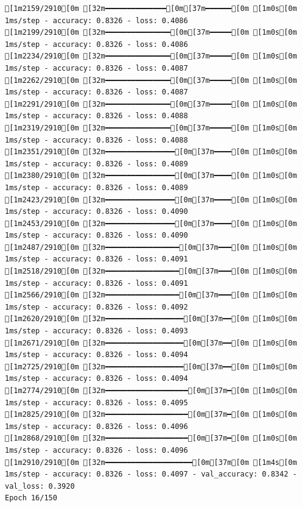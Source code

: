 \documentclass[
  letterpaper,
  DIV=11,
  numbers=noendperiod]{scrartcl}
\begin{document}
\begin{verbatim}
[1m2159/2910[0m [32m━━━━━━━━━━━━━━[0m[37m━━━━━━[0m [1m0s[0m 1ms/step - accuracy: 0.8326 - loss: 0.4086
[1m2199/2910[0m [32m━━━━━━━━━━━━━━━[0m[37m━━━━━[0m [1m0s[0m 1ms/step - accuracy: 0.8326 - loss: 0.4086
[1m2234/2910[0m [32m━━━━━━━━━━━━━━━[0m[37m━━━━━[0m [1m0s[0m 1ms/step - accuracy: 0.8326 - loss: 0.4087
[1m2262/2910[0m [32m━━━━━━━━━━━━━━━[0m[37m━━━━━[0m [1m0s[0m 1ms/step - accuracy: 0.8326 - loss: 0.4087
[1m2291/2910[0m [32m━━━━━━━━━━━━━━━[0m[37m━━━━━[0m [1m0s[0m 1ms/step - accuracy: 0.8326 - loss: 0.4088
[1m2319/2910[0m [32m━━━━━━━━━━━━━━━[0m[37m━━━━━[0m [1m0s[0m 1ms/step - accuracy: 0.8326 - loss: 0.4088
[1m2351/2910[0m [32m━━━━━━━━━━━━━━━━[0m[37m━━━━[0m [1m0s[0m 1ms/step - accuracy: 0.8326 - loss: 0.4089
[1m2380/2910[0m [32m━━━━━━━━━━━━━━━━[0m[37m━━━━[0m [1m0s[0m 1ms/step - accuracy: 0.8326 - loss: 0.4089
[1m2423/2910[0m [32m━━━━━━━━━━━━━━━━[0m[37m━━━━[0m [1m0s[0m 1ms/step - accuracy: 0.8326 - loss: 0.4090
[1m2453/2910[0m [32m━━━━━━━━━━━━━━━━[0m[37m━━━━[0m [1m0s[0m 1ms/step - accuracy: 0.8326 - loss: 0.4090
[1m2487/2910[0m [32m━━━━━━━━━━━━━━━━━[0m[37m━━━[0m [1m0s[0m 1ms/step - accuracy: 0.8326 - loss: 0.4091
[1m2518/2910[0m [32m━━━━━━━━━━━━━━━━━[0m[37m━━━[0m [1m0s[0m 1ms/step - accuracy: 0.8326 - loss: 0.4091
[1m2566/2910[0m [32m━━━━━━━━━━━━━━━━━[0m[37m━━━[0m [1m0s[0m 1ms/step - accuracy: 0.8326 - loss: 0.4092
[1m2620/2910[0m [32m━━━━━━━━━━━━━━━━━━[0m[37m━━[0m [1m0s[0m 1ms/step - accuracy: 0.8326 - loss: 0.4093
[1m2671/2910[0m [32m━━━━━━━━━━━━━━━━━━[0m[37m━━[0m [1m0s[0m 1ms/step - accuracy: 0.8326 - loss: 0.4094
[1m2725/2910[0m [32m━━━━━━━━━━━━━━━━━━[0m[37m━━[0m [1m0s[0m 1ms/step - accuracy: 0.8326 - loss: 0.4094
[1m2774/2910[0m [32m━━━━━━━━━━━━━━━━━━━[0m[37m━[0m [1m0s[0m 1ms/step - accuracy: 0.8326 - loss: 0.4095
[1m2825/2910[0m [32m━━━━━━━━━━━━━━━━━━━[0m[37m━[0m [1m0s[0m 1ms/step - accuracy: 0.8326 - loss: 0.4096
[1m2868/2910[0m [32m━━━━━━━━━━━━━━━━━━━[0m[37m━[0m [1m0s[0m 1ms/step - accuracy: 0.8326 - loss: 0.4096
[1m2910/2910[0m [32m━━━━━━━━━━━━━━━━━━━━[0m[37m[0m [1m4s[0m 1ms/step - accuracy: 0.8326 - loss: 0.4097 - val_accuracy: 0.8342 - val_loss: 0.3920
Epoch 16/150


\end{verbatim}
\end{document}
